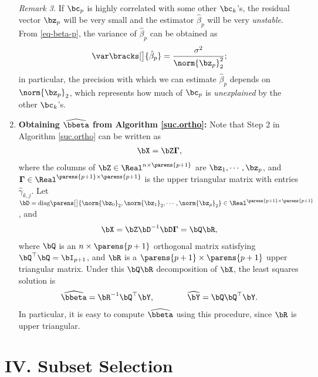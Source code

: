 \documentclass[12pt]{article}
\begin{document}
\begin{enumerate}[label=\textbf{\arabic*.}]
	\textit{Remark 3.} If $\bc_p$ is highly correlated with some other $\bc_k$'s, the residual vector $\bz_p$ will be very small and the estimator $\hat{\beta}_p$ will be very \emph{unstable}. From \eqref{eq-beta-p}, the variance of $\hat{\beta}_p$ can be obtained as 
	\begin{align*}
		\var \bracks[\big]{\hat{\beta}_p} = \frac{\sigma^2}{\norm{\bz_{p}}_2^2}; 
	\end{align*}
	in particular, the precision with which we can estimate $\hat{\beta}_p$ depends on $\norm{\bz_p}_2$, which represents how much of $\bc_p$ is \emph{unexplained} by the other $\bc_k$'s. 
	
	\item \textbf{Obtaining $\widehat{\bbeta}$ from Algorithm \ref{suc.ortho}:} Note that Step 2 in Algorithm \ref{suc.ortho} can be written as 
	\begin{align*}
		\bX = \bZ \mathbf{\Gamma}, 
	\end{align*}
	where the columns of $\bZ \in \Real^{n \times \parens{p+1}}$ are $\bz_1, \cdots, \bz_p$, and $\mathbf{\Gamma} \in \Real^{\parens{p+1} \times \parens{p+1}}$ is the upper triangular matrix with entries $\hat{\gamma}_{k,j}$. Let $\bD = \mathrm{diag} \parens[\big]{\norm{\bz_0}_2, \norm{\bz_1}_2, \cdots, \norm{\bz_p}_2} \in \Real^{\parens{p+1} \times \parens{p+1}}$, and 
	\begin{align*}
		\bX = \bZ \bD^{-1} \bD \mathbf{\Gamma} = \bQ \bR, 
	\end{align*}
	where $\bQ$ is an $n \times \parens{p+1}$ orthogonal matrix satisfying $\bQ^\top \bQ = \bI_{p+1}$, and $\bR$ is a $\parens{p+1} \times \parens{p+1}$ upper triangular matrix. Under this $\bQ \bR$ decomposition of $\bX$, the least squares solution is 
	\begin{align*}
		\widehat{\bbeta} = \bR^{-1} \bQ^\top \bY, \qquad \qquad \widehat{\bY} = \bQ \bQ^\top \bY. 
	\end{align*}
	In particular, it is easy to compute $\widehat{\bbeta}$ using this procedure, since $\bR$ is upper triangular. 
	
\end{enumerate}


\section*{IV. Subset Selection}
\end{document}
